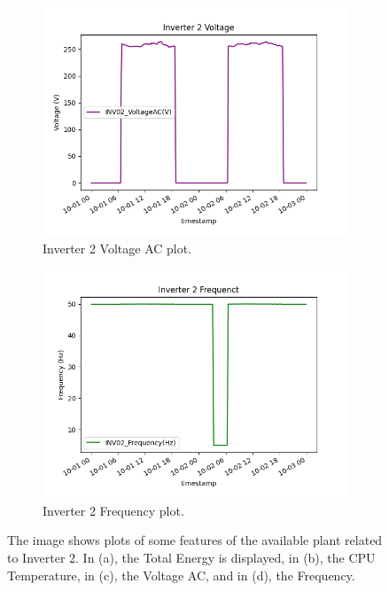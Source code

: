 \begin{figure}[H]
	\begin{subfigure}[t]{0.45\textwidth}
		\centering
		\includegraphics[width=\textwidth, keepaspectratio]{chapters/1_introduction/imgs/inv2voltage.png}
		\caption{Inverter 2 Voltage AC plot.}
		\label{fig:inv02volt}
	\end{subfigure}
	\hspace{0.5cm}
	\begin{subfigure}[t]{0.45\textwidth}
		\centering
		\includegraphics[width=\textwidth, keepaspectratio]{chapters/1_introduction/imgs/inv2freq.png}
		\caption{Inverter 2 Frequency plot.}
		\label{fig:inv02freq}
	\end{subfigure}
	\caption{The image shows plots of some features of the available plant related to Inverter 2. In (a), the Total Energy is displayed, in (b), the CPU Temperature, in (c), the Voltage AC, and in (d), the Frequency.}
\end{figure}


